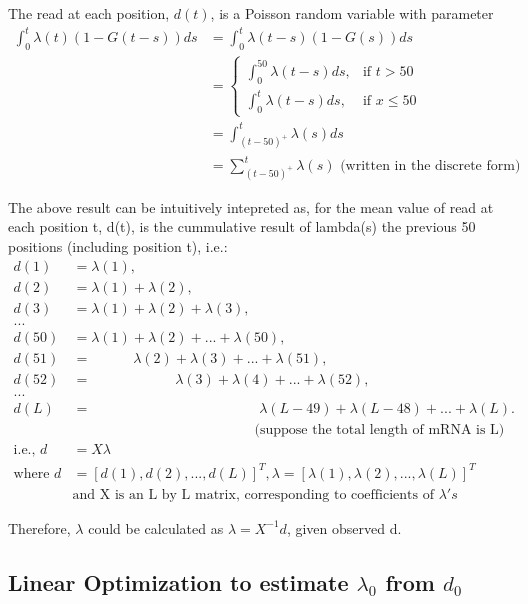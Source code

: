 \documentclass{article}
\begin{document}
The read at each position, $d(t)$, is a Poisson random variable with parameter 
\begin{align*}
\int_0^t \lambda(t)(1-G(t-s)) ds &=\int_0^t \lambda(t-s)(1-G(s))ds\\
&=  \begin{cases}
\int_0^{50} \lambda(t-s)ds, & \text{if } t > 50\\
\int_0^t \lambda(t-s)ds,    & \text{if } x \le 50
\end{cases}\\
&=\int_{(t-50)^+}^{t} \lambda(s)ds\\
&=\sum_{(t-50)^+}^{t} \lambda(s) \text{ (written in the discrete form)}
\end{align*}

The above result can be intuitively intepreted as, for the mean value of read at each position t, d(t), is the cummulative result of lambda(s) the previous 50 positions (including position t), i.e.:
\begin{align*}
d(1) &= \lambda(1),\\
d(2) &= \lambda(1)+\lambda(2),\\
d(3) &= \lambda(1)+\lambda(2)+\lambda(3),\\
...\\
d(50)&= \lambda(1)+\lambda(2)+... + \lambda(50),\\
d(51)&= \quad \quad \quad  \lambda(2)+\lambda(3)+... + \lambda(51),\\
d(52)&= \quad \quad \quad\quad \quad \quad\lambda(3)+\lambda(4)+... + \lambda(52),\\
...\\
d(L)&=\quad \quad \quad\quad \quad \quad\quad \quad \quad\quad \quad \quad \lambda(L-49)+\lambda(L-48)+... + \lambda(L).\\
&\quad \quad \quad\quad \quad \quad\quad \quad \quad\quad \quad \quad \quad \text{(suppose the total length of mRNA is L)}\\
\text{i.e., } d&=X\lambda\\
\text{where } d&=[d(1),d(2),...,d(L)]^T, \lambda=[\lambda(1),\lambda(2),...,\lambda(L)]^T\\
&\text{and X is an L by L matrix, corresponding to coefficients of } \lambda's
\end{align*}

Therefore, $\lambda$ could be calculated as $\lambda=X^{-1}d$, given observed d.

\subsection{Linear Optimization to estimate $\lambda_0$ from $d_0$}
\end{document}
